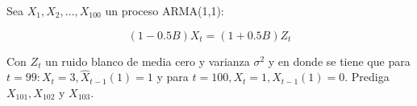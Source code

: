 \addpoints

\question[10] Sea $X_1,X_2,\dots,X_100$ un proceso ARMA(1,1):

$$(1-0.5B)X_t=(1+0.5B)Z_t$$

Con $Z_t$ un ruido blanco de media cero y varianza $\sigma^2$ y en donde se tiene que para $t=99: X_t=3, \hat{X}_{t-1}(1)=1$ y para $t=100, X_{t}=1, \hat{X}_{t-1}(1)=0$. Prediga $X_{101},X_{102}$ y $X_{103}$. 

